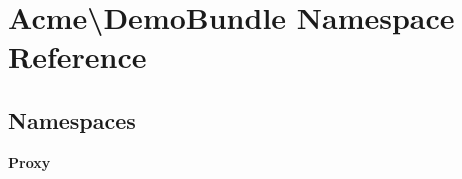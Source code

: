 \section{Acme\textbackslash{}Demo\+Bundle Namespace Reference}
\label{namespace_acme_1_1_demo_bundle}
\subsection*{Namespaces}
\begin{DoxyCompactItemize}
\item 
 {\bf Proxy}
\end{DoxyCompactItemize}
